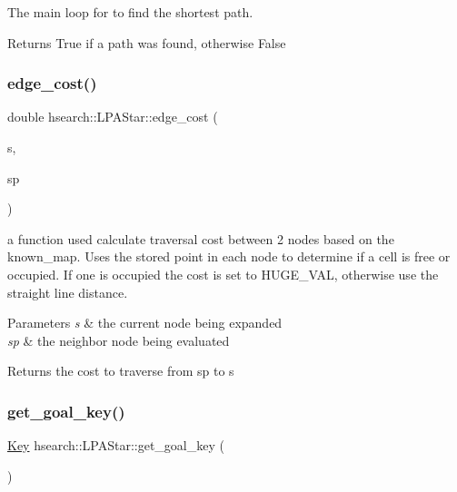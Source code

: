 The main loop for to find the shortest path. 

\begin{DoxyReturn}{Returns}
True if a path was found, otherwise False 
\end{DoxyReturn}
\mbox{\label{classhsearch_1_1LPAStar_a92e2fda4e5b1f8ab77297d8cd45e56a7}} 
\subsubsection{\texorpdfstring{edge\+\_\+cost()}{edge\_cost()}}
{\footnotesize\ttfamily double hsearch\+::\+L\+P\+A\+Star\+::edge\+\_\+cost (\begin{DoxyParamCaption}\item[{\hyperlink{structhsearch_1_1SearchNode}{Search\+Node} \&}]{s,  }\item[{\hyperlink{structhsearch_1_1SearchNode}{Search\+Node} \&}]{sp }\end{DoxyParamCaption})\hspace{0.3cm}{\ttfamily [protected]}}



a function used calculate traversal cost between 2 nodes based on the known\+\_\+map. Uses the stored point in each node to determine if a cell is free or occupied. If one is occupied the cost is set to H\+U\+G\+E\+\_\+\+V\+AL, otherwise use the straight line distance. 


\begin{DoxyParams}{Parameters}
{\em s} & the current node being expanded \\
\hline
{\em sp} & the neighbor node being evaluated \\
\hline
\end{DoxyParams}
\begin{DoxyReturn}{Returns}
the cost to traverse from sp to s 
\end{DoxyReturn}
\mbox{\label{classhsearch_1_1LPAStar_abffa3312bfb076a9c48ca40de32ec9b2}} 
\subsubsection{\texorpdfstring{get\+\_\+goal\+\_\+key()}{get\_goal\_key()}}
{\footnotesize\ttfamily \hyperlink{structhsearch_1_1Key}{Key} hsearch\+::\+L\+P\+A\+Star\+::get\+\_\+goal\+\_\+key (\begin{DoxyParamCaption}{ }\end{DoxyParamCaption})\hspace{0.3cm}{\ttfamily [protected]}}



